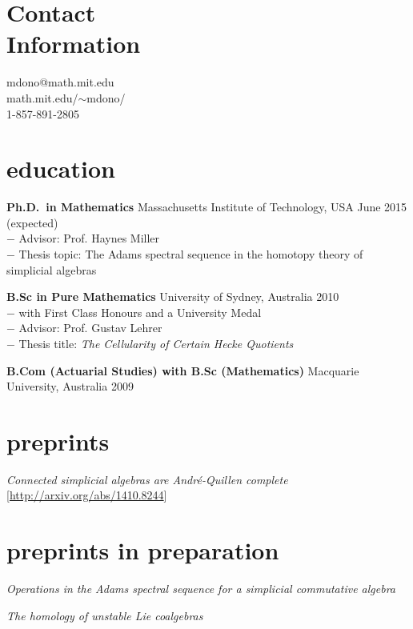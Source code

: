 \documentclass[margin,line]{resume}
\newcommand{\CVsection}[1]{\section{\mysidestyle #1}}
\newcommand{\entry}[3]{\textbf{#1} #2 \hfill {#3}
           
\vspace{-2.7mm}}
\newcommand{\twolineentry}[4]{\textbf{#1} #2 \hfill {#4}\\%
#3
           
\vspace{-2.7mm}}
\newcommand{\FINALentry}[3]{\textbf{#1} #2 \hfill {#3}}
\begin{document}
\name{\raisebox{.1cm}{\LARGE\sc Michael Jack Donovan}}
\begin{resume}


\CVsection{Contact\\Information}


{mdono@math.mit.edu}\\
{math.mit.edu/$\sim$mdono/}\\
1-857-891-2805





\CVsection{education}

\twolineentry{Ph.D.\ in Mathematics}{Massachusetts Institute of Technology, USA}{%
\phantom{space}$-$ Advisor: Prof. Haynes Miller\\
\phantom{space}$-$ Thesis topic: The Adams spectral sequence in the homotopy theory of simplicial algebras%
}{June 2015 (expected)}
\twolineentry{B.Sc in Pure Mathematics}{University of Sydney, Australia}{%
\phantom{space}$-$ with First Class Honours and a University Medal\\
\phantom{space}$-$ Advisor: Prof. Gustav Lehrer\\
\phantom{space}$-$ Thesis title: \emph{The Cellularity of Certain Hecke Quotients}
}{2010}
\FINALentry{B.Com (Actuarial Studies) with B.Sc (Mathematics)}{Macquarie University, Australia}{2009}


\CVsection{preprints}

\entry{\hspace{-.275em}}{\emph{Connected simplicial algebras are Andr\'e-Quillen complete}}{ [\url{http://arxiv.org/abs/1410.8244}]}

\CVsection{preprints in preparation}
\entry{\hspace{-.275em}}{\emph{Operations in the Adams spectral sequence for a simplicial commutative algebra}}{}
\entry{\hspace{-.275em}}{\emph{The homology of unstable Lie coalgebras}}{}



\end{resume}
\end{document}
